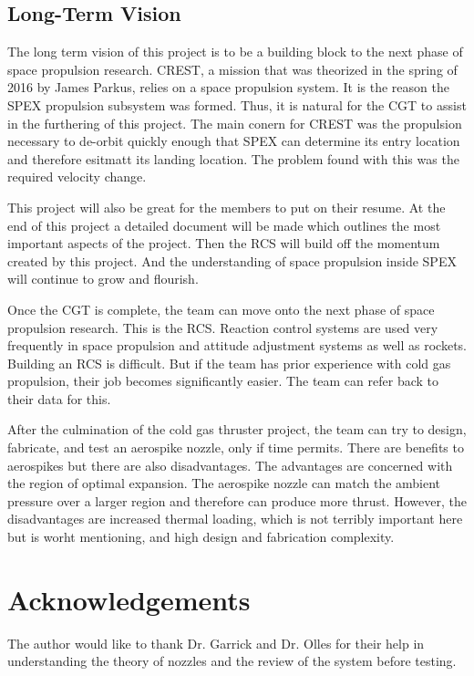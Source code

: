 \documentclass[conference]{IEEEtran} %
\begin{document}
\subsection{Long-Term Vision}
\label{sec:vision}

The long term vision of this project is to be a building block to the next phase of space propulsion research. CREST, a mission that was theorized in the
spring of 2016 by James Parkus, relies on a space propulsion system. It is the reason the SPEX propulsion subsystem was formed. Thus, it is natural for the
CGT to assist in the furthering of this project. The main conern for CREST was the propulsion necessary to de-orbit quickly enough that SPEX can determine its entry location and therefore esitmatt its landing location.
The problem found with this was the required velocity change.

This project will also be great for
the members to put on their resume. At the end of this project a detailed document will be made which outlines the most important aspects of the project.
Then the RCS will build off the momentum created by this project. And the understanding of space propulsion inside SPEX will continue to grow and flourish.

Once the CGT is complete, the team can move onto the next phase of space propulsion research. This is the RCS\@. Reaction control systems are used very
frequently in space propulsion and attitude adjustment systems as well as rockets. Building an RCS is difficult. But if the team
has prior experience with cold gas propulsion, their job becomes significantly easier. The team can refer back to their data for this.

After the culmination of the cold gas thruster project, the team can try to design, fabricate, and test an aerospike nozzle, only if time permits.
There are benefits to aerospikes but there are also disadvantages. The advantages are concerned with the region of optimal expansion. The aerospike nozzle can match the
ambient pressure over a larger region and therefore can produce more thrust. However, the disadvantages are increased thermal loading, which is not terribly important here but is worht mentioning,
and high design and fabrication complexity.

\section*{Acknowledgements}
The author would like to thank Dr. Garrick and Dr. Olles for their help in understanding the theory of nozzles and the review of the system before testing.
\end{document}
